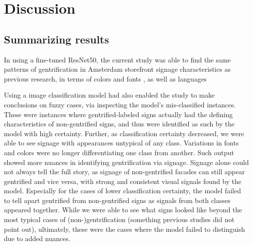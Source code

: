 \newpage
\section{Discussion}
\label{sec:discussion}


\subsection{Summarizing results}

In using a fine-tuned ResNet50, the current study was able to find the same patterns of gentrification in Amsterdam storefront signage characteristics as previous research, in terms of colors and fonts \cite{rahman_signage_2020, trinch_signsays_2017, snajdr_oldschool_2018, snajdr_preserve_2022}, as well as languages \cite{kasanga_map_2012, trinch_signsays_2017}

Using a image classification model had also enabled the study to make conclusions on fuzzy cases, via inspecting the model's mis-classified instances. These were instances where gentrified-labeled signs actually had the defining characteristics of non-gentrified signs, and thus were identified as such by the model with high certainty. Further, as classification certainty decreased, we were able to see signage with appearances untypical of any class. Variations in fonts and colors were no longer differentiating one class from another. Such output showed more nuances in identifying gentrification via signage. Signage alone could not always tell the full story, as signage of non-gentrified facades can still appear gentrified and vice versa, with strong and consistent visual signals found by the model. Especially for the cases of lower classification certainty, the model failed to tell apart gentrified from non-gentrified signs as signals from both classes appeared together. While we were able to see what signs looked like  beyond the most typical cases of (non-)gentrification (something previous studies did not point out), ultimately, these were the cases where the model failed to distinguish due to added nuances.


